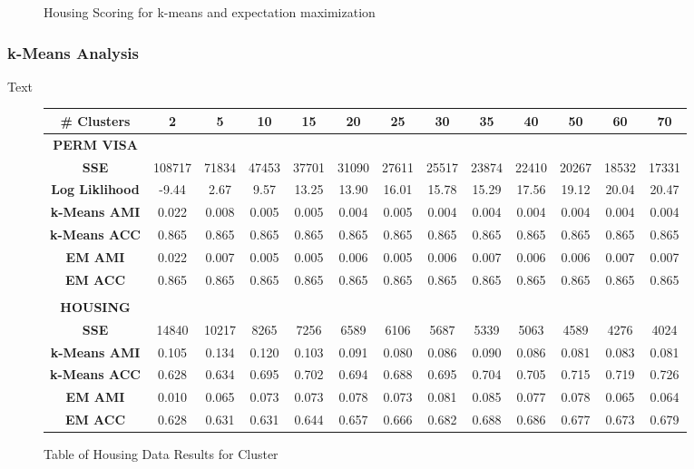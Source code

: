 \documentclass[h]{article}
\begin{document}
\begin{figure}[H]
      \caption*{Housing Scoring for k-means and expectation maximization} 
   \endminipage\hfill
\end{figure}

\subsubsection*{k-Means Analysis}
Text

\begin{figure}[H] 
\begin{tabular}{ | c | c  | c | c | c | c | c | c| c| c| c| c| c | } 
\hline
\textbf{ # Clusters } & \textbf{2} & \textbf{5} & \textbf{10} & \textbf{15} & \textbf{20} & \textbf{25} & \textbf{30} & \textbf{35} & \textbf{40} & \textbf{50} & \textbf{60} & \textbf{70}   \\
\hline
\textbf{PERM VISA} \\ \hline
\textbf{SSE} &  108717 & 71834 & 47453 & 37701 & 31090 & 27611 & 25517 & 23874 & 22410 & 20267 & 18532 & 17331 \\ \hline
\textbf{Log Liklihood} & -9.44 & 2.67 & 9.57 & 13.25 & 13.90 & 16.01 & 15.78 & 15.29 & 17.56 & 19.12 & 20.04 & 20.47 \\ \hline
\textbf{k-Means AMI} & 0.022 & 0.008 & 0.005 & 0.005 & 0.004 & 0.005 & 0.004 & 0.004 & 0.004 & 0.004 & 0.004 & 0.004 \\ \hline
\textbf{k-Means ACC} & 0.865 & 0.865 & 0.865 & 0.865 & 0.865 & 0.865 & 0.865 & 0.865 & 0.865 & 0.865 & 0.865 & 0.865 \\ \hline
\textbf{EM AMI} & 0.022 & 0.007 & 0.005 & 0.005 & 0.006 & 0.005 & 0.006 & 0.007 & 0.006 & 0.006 & 0.007 & 0.007 \\ \hline
\textbf{EM ACC} & 0.865 & 0.865 & 0.865 & 0.865 & 0.865 & 0.865 & 0.865 & 0.865 & 0.865 & 0.865 & 0.865 & 0.865 \\ \hline
\\
\textbf{HOUSING} \\ \hline
\textbf{SSE} & 14840 & 10217 & 8265 & 7256 & 6589 & 6106 & 5687 & 5339 & 5063 & 4589 & 4276 & 4024 \\ \hline
\textbf{k-Means AMI} & 0.105 & 0.134 & 0.120 & 0.103 & 0.091 & 0.080 & 0.086 & 0.090 & 0.086 & 0.081 & 0.083 & 0.081 \\ \hline
\textbf{k-Means ACC} & 0.628 & 0.634 & 0.695 & 0.702 & 0.694 & 0.688 & 0.695 & 0.704 & 0.705 & 0.715 & 0.719 & 0.726 \\ \hline
\textbf{EM AMI} & 0.010 & 0.065 & 0.073 & 0.073 & 0.078 & 0.073 & 0.081 & 0.085 & 0.077 & 0.078 & 0.065 & 0.064 \\ \hline
\textbf{EM ACC} & 0.628 & 0.631 & 0.631 & 0.644 & 0.657 & 0.666 & 0.682 & 0.688 & 0.686 & 0.677 & 0.673 & 0.679 \\ \hline
\end{tabular}
\caption*{Table of Housing Data Results for Cluster } 
\end{figure}
\end{document}
